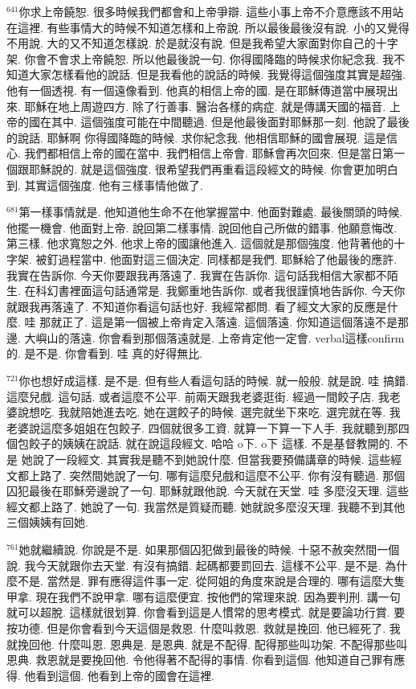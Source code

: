 \documentclass{book}
\begin{document}
$^{641}$你求上帝饒恕.
很多時候我們都會和上帝爭辯.
這些小事上帝不介意應該不用站在這裡.
有些事情大的時候不知道怎樣和上帝說.
所以最後最後沒有說.
小的又覺得不用說.
大的又不知道怎樣說.
於是就沒有說.
但是我希望大家面對你自己的十字架.
你會不會求上帝饒恕.
所以他最後說一句.
你得國降臨的時候求你紀念我.
我不知道大家怎樣看他的說話.
但是我看他的說話的時候.
我覺得這個強度其實是超強.
他有一個透視.
有一個遠像看到.
他真的相信上帝的國.
是在耶穌傳道當中展現出來.
耶穌在地上周遊四方.
除了行善事.
醫治各樣的病症.
就是傳講天國的福音.
上帝的國在其中.
這個強度可能在中間聽過.
但是他最後面對耶穌那一刻.
他說了最後的說話.
耶穌啊 你得國降臨的時候.
求你紀念我.
他相信耶穌的國會展現.
這是信心.
我們都相信上帝的國在當中.
我們相信上帝會.
耶穌會再次回來.
但是當日第一個跟耶穌說的.
就是這個強度.
很希望我們再重看這段經文的時候.
你會更加明白到.
其實這個強度.
他有三樣事情他做了.

$^{681}$第一樣事情就是.
他知道他生命不在他掌握當中.
他面對難處.
最後關頭的時候.
他擺一機會.
他面對上帝.
說回第二樣事情.
說回他自己所做的錯事.
他願意悔改.
第三樣.
他求寬恕之外.
他求上帝的國讓他進入.
這個就是那個強度.
他背著他的十字架.
被釘過程當中.
他面對這三個決定.
同樣都是我們.
耶穌給了他最後的應許.
我實在告訴你.
今天你要跟我再落遠了.
我實在告訴你.
這句話我相信大家都不陌生.
在科幻書裡面這句話通常是.
我鄭重地告訴你.
或者我很謹慎地告訴你.
今天你就跟我再落遠了.
不知道你看這句話也好.
我經常都問.
看了經文大家的反應是什麼.
哇 那就正了.
這是第一個被上帝肯定入落遠.
這個落遠.
你知道這個落遠不是那邊.
大嶼山的落遠.
你會看到那個落遠就是.
上帝肯定他一定會.
verbal這樣confirm的.
是不是.
你會看到.
哇 真的好得無比.

$^{721}$你也想好成這樣.
是不是.
但有些人看這句話的時候.
就一般般.
就是說.
哇 搞錯.
這麼兒戲.
這句話.
或者這麼不公平.
前兩天跟我老婆逛街.
經過一間餃子店.
我老婆說想吃.
我就陪她進去吃.
她在選餃子的時候.
選完就坐下來吃.
選完就在等.
我老婆說這麼多姐姐在包餃子.
四個就很多工資.
就算一下算一下人手.
我就聽到那四個包餃子的姨姨在說話.
就在說這段經文.
哈哈 o下.
o下 這樣.
不是基督教開的.
不是 她說了一段經文.
其實我是聽不到她說什麼.
但當我要預備講章的時候.
這些經文都上路了.
突然間她說了一句.
哪有這麼兒戲和這麼不公平.
你有沒有聽過.
那個囚犯最後在耶穌旁邊說了一句.
耶穌就跟他說.
今天就在天堂.
哇 多麼沒天理.
這些經文都上路了.
她說了一句.
我當然是質疑而聽.
她就說多麼沒天理.
我聽不到其他三個姨姨有回她.

$^{761}$她就繼續說.
你說是不是.
如果那個囚犯做到最後的時候.
十惡不赦突然間一個說.
我今天就跟你去天堂.
有沒有搞錯.
起碼都要罰回去.
這樣不公平.
是不是.
為什麼不是.
當然是.
罪有應得這件事一定.
從阿姐的角度來說是合理的.
哪有這麼大隻甲拿.
現在我們不說甲拿.
哪有這麼便宜.
按他們的常理來說.
因為要判刑.
講一句就可以超脫.
這樣就很划算.
你會看到這是人慣常的思考模式.
就是要論功行賞.
要按功德.
但是你會看到今天這個是救恩.
什麼叫救恩.
救就是挽回.
他已經死了.
我就挽回他.
什麼叫恩.
恩典是.
是恩典.
就是不配得.
配得那些叫功架.
不配得那些叫恩典.
救恩就是要挽回他.
令他得著不配得的事情.
你看到這個.
他知道自己罪有應得.
他看到這個.
他看到上帝的國會在這裡.
\end{document}
